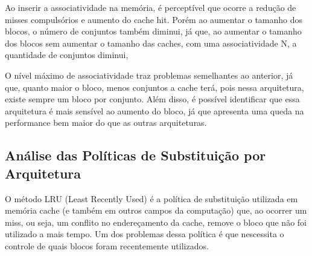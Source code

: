 \documentclass[conference]{IEEEtran}
\begin{document}
Ao inserir a associatividade na memória, é perceptível que ocorre a redução de misses compulsórios e aumento do cache hit. Porém ao aumentar o tamanho dos blocos, o número de conjuntos também diminui, já que, ao aumentar o tamanho dos blocos sem aumentar o tamanho das caches, com uma associatividade N, a quantidade de conjuntos diminui,


O nível máximo de associatividade traz problemas semelhantes ao anterior, já que, quanto maior o bloco, menos conjuntos a cache terá, pois nessa arquitetura, existe sempre um bloco por conjunto. Além disso, é possível identificar que essa arquitetura é mais sensível ao aumento do bloco, já que apresenta uma queda na performance bem maior do que as outras arquiteturas.

\subsection{Análise das Políticas de Substituição por Arquitetura}


O método LRU (Least Recently Used) é a política de substituição utilizada em memória cache (e também em outros campos da computação) que, ao ocorrer um miss, ou seja, um conflito no endereçamento da cache, remove o bloco que não foi utilizado a mais tempo. Um dos problemas dessa política é que nescessita o controle de quais blocos foram recentemente utilizados.
\end{document}
